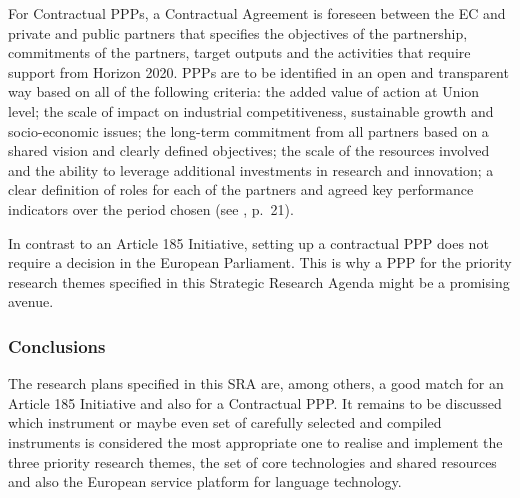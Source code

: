 \documentclass[10pt, plain]{../../metanetpaper}
\begin{document}
\begin{multicols}{2}
For Contractual PPPs, a Contractual Agreement is foreseen between the EC and private and public partners that specifies the objectives of the partnership, commitments of the partners, target outputs and the activities that require support from Horizon 2020. PPPs are to be identified in an open and transparent way based on all of the following criteria: the added value of action at Union level; the scale of impact on industrial competitiveness, sustainable growth and socio-economic issues; the long-term commitment from all partners based on a shared vision and clearly defined objectives; the scale of the resources involved and the ability to leverage additional investments in research and innovation; a clear definition of roles for each of the partners and agreed key performance indicators over the period chosen (see \cite{H2020prop}, p.~21).

In contrast to an Article 185 Initiative, setting up a contractual PPP does not require a decision in the European Parliament. This is why a PPP for the priority research themes specified in this Strategic Research Agenda might be a promising avenue.  

\subsubsection{Conclusions}
\label{sec:funding-conclusions}

The research plans specified in this SRA are, among others, a good match for an Article 185 Initiative and also for a Contractual PPP. It remains to be discussed which instrument or maybe even set of carefully selected and compiled instruments is considered the most appropriate one to realise and implement the three priority research themes, the set of core technologies and shared resources and also the European service platform for language technology.


\end{multicols}
\end{document}
